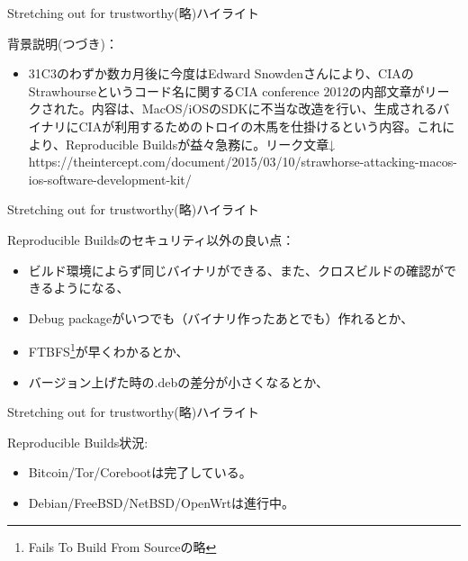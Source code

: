 \begin{frame}{Stretching out for trustworthy(略)ハイライト}   

  背景説明(つづき)：
 \begin{itemize}
\item 31C3のわずか数カ月後に今度はEdward Snowdenさんにより、CIAのStrawhourseというコード名に関するCIA conference 2012の内部文章がリークされた。内容は、MacOS/iOSのSDKに不当な改造を行い、生成されるバイナリにCIAが利用するためのトロイの木馬を仕掛けるという内容。これにより、Reproducible Buildsが益々急務に。リーク文章↓\\
 https://theintercept.com/document/2015/03/10/strawhorse-attacking-macos-ios-software-development-kit/
 \end{itemize}
\end{frame}

\begin{frame}{Stretching out for trustworthy(略)ハイライト}

 Reproducible Buildsのセキュリティ以外の良い点：
 \begin{itemize}
 \item ビルド環境によらず同じバイナリができる、また、クロスビルドの確認ができるようになる、
 \item Debug packageがいつでも（バイナリ作ったあとでも）作れるとか、
 \item FTBFS\footnote{Fails To Build From Sourceの略}が早くわかるとか、
 \item バージョン上げた時の.debの差分が小さくなるとか、
 \end{itemize}

\end{frame}

\begin{frame}{Stretching out for trustworthy(略)ハイライト}

 Reproducible Builds状況:
 \begin{itemize}
 \item Bitcoin/Tor/Corebootは完了している。
 \item Debian/FreeBSD/NetBSD/OpenWrtは進行中。
 \end{itemize}
\end{frame}

